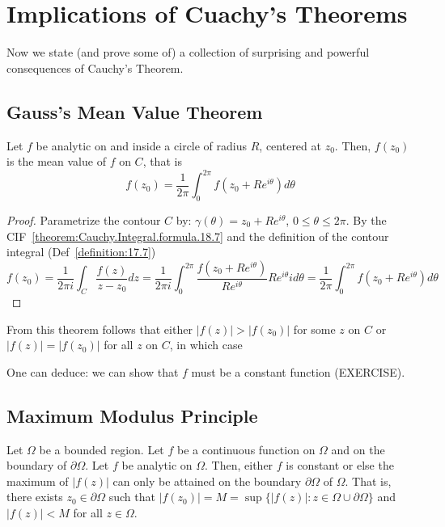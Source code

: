\section{Implications of Cuachy's Theorems}

Now we state (and prove some of) a collection of surprising and powerful consequences of Cauchy's Theorem.

\subsection{Gauss's Mean Value Theorem}

\begin{theorem}\label{theorem:GaussMVT.20.1}
    Let $f$ be analytic on and inside a circle of radius $R$, centered at $z_0$. Then, $f(z_0)$ is the mean value of $f$ on $C$, that is
    \[
        f(z_0) = \frac{1}{2\pi} \int_0^{2\pi} f(z_0 + Re^{i\theta}) d\theta
    \]
\end{theorem}

\begin{proof}
   
     Parametrize the contour $C$ by: $\gamma(\theta) = z_0 + Re^{i\theta}$, $0 \le \theta \le 2\pi$. By the CIF~\ref{theorem:Cauchy.Integral.formula.18.7} and the definition of the contour integral (Def~\ref{definition:17.7})
        \[
            f(z_0) = \frac{1}{2\pi i} \int_C \frac{f(z)}{z-z_0} dz = \frac{1}{2\pi i} \int_0^{2\pi} \frac{f(z_0 + Re^{i\theta})}{Re^{i\theta}} Re^{i\theta} i d\theta = \frac{1}{2\pi} \int_0^{2\pi} f(z_0 + Re^{i\theta}) d\theta
            \]
        \end{proof}
            
From this theorem follows that either $|f(z)| > |f(z_0)|$ for some $z$ on $C$ or $|f(z)| = |f(z_0)|$ for all $z$ on $C$, in which case


One can deduce: we can show that $f$ must be a constant function (EXERCISE).

\subsection{Maximum Modulus Principle}

\begin{theorem}\label{theorem:Max.Modulus.Principle.20.2}
    Let $\Omega$ be a bounded region. Let $f$ be a continuous function on $\Omega$ and on the boundary of $\partial \Omega$. Let $f$ be analytic on $\Omega$. Then, either $f$ is constant or else the maximum of $|f(z)|$ can only be attained on the boundary $\partial \Omega$ of $\Omega$. That is, there exists $z_0 \in \partial \Omega$ such that $|f(z_0)| = M = \sup \{|f(z)|: z \in \Omega \cup \partial \Omega\}$ and $|f(z)| < M$ for all $z \in \Omega$.
\end{theorem}

